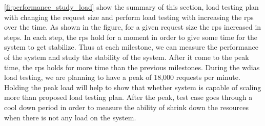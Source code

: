 \cref{fi:performance_study_load} show the summary of this section, load testing plan with changing the request size and perform load testing with increasing the \acrshort{rps} over the time. As shown in the figure, for a given request size the \acrshort{rps} increased in steps. In each step, the \acrshort{rps} hold for a moment in order to give some time for the system to get stabilize. Thus at each milestone, we can measure the performance of the system and study the stability of the system. After it come to the peak time, the \acrshort{rps} holds for more time than the previous milestones. During the \acrshort{wdias} load testing, we are planning to have a peak of 18,000 requests per minute. Holding the peak load will help to show that whether system is capable of scaling more than proposed load testing plan. After the peak, test case goes through a cool down period in order to measure the ability of shrink down the resources when there is not any load on the system.

